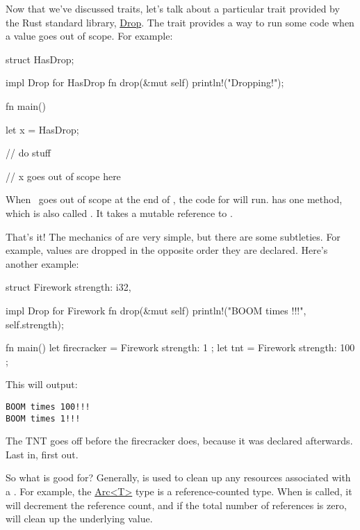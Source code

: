 Now that we've discussed traits, let's talk about a particular trait provided by the Rust standard library, 
\href{https://doc.rust-lang.org/std/ops/trait.Drop.html}{Drop}. The  trait provides a way to run some code when a value goes out of 
scope. For example:

\begin{rustc}
struct HasDrop;

impl Drop for HasDrop {
    fn drop(&mut self) {
        println!("Dropping!");
    }
}

fn main() {
    let x = HasDrop;

    // do stuff

} // x goes out of scope here
\end{rustc}

When \x\ goes out of scope at the end of , the code for  will run.  has one method, which is also called 
. It takes a mutable reference to .

\blank

That's it! The mechanics of  are very simple, but there are some subtleties. For example, values are dropped in the opposite 
order they are declared. Here's another example:

\begin{rustc}
struct Firework {
    strength: i32,
}

impl Drop for Firework {
    fn drop(&mut self) {
        println!("BOOM times {}!!!", self.strength);
    }
}

fn main() {
    let firecracker = Firework { strength: 1 };
    let tnt = Firework { strength: 100 };
}
\end{rustc}

This will output:

\begin{verbatim}
BOOM times 100!!!
BOOM times 1!!!
\end{verbatim}

The TNT goes off before the firecracker does, because it was declared afterwards. Last in, first out.

\blank

So what is  good for? Generally,  is used to clean up any resources associated with a \struct. For example, the 
\href{https://doc.rust-lang.org/std/sync/struct.Arc.html}{Arc<T>} type is a reference-counted type. When  is called, it will 
decrement the reference count, and if the total number of references is zero, will clean up the underlying value.
